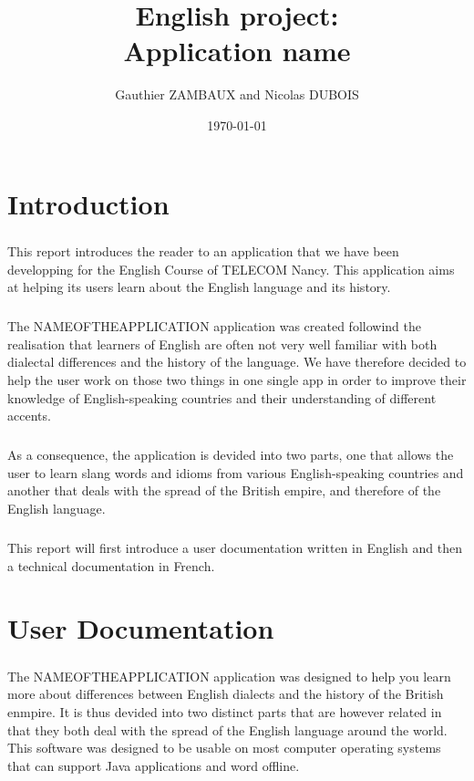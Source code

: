 \documentclass[11pt, a4paper]{report}
\title{English project:\\Application name}
\author{Gauthier ZAMBAUX and Nicolas DUBOIS}
\date{\today}
\begin{document}
\maketitle


\chapter*{Introduction}
\paragraph{}This report introduces the reader to an application that we have been developping for the English Course of TELECOM Nancy. This application aims at helping its users learn about the English language and its history.

\paragraph{}The NAMEOFTHEAPPLICATION application was created followind the realisation that learners of English are often not very well familiar with both dialectal differences and the history of the language. We have therefore decided to help the user work on those two things in one single app in order to improve their knowledge of English-speaking countries and their understanding of different accents.

\paragraph{}As a consequence, the application is devided into two parts, one that allows the user to learn slang words and idioms from various English-speaking countries and another that deals with the spread of the British empire, and therefore of the English language.

\paragraph{}This report will first introduce a user documentation written in English and then a technical documentation in French.


\chapter*{User Documentation}
\paragraph{}The NAMEOFTHEAPPLICATION application was designed to help you learn more about differences between English dialects and the history of the British enmpire. It is thus devided into two distinct parts that are however related in that they both deal with the spread of the English language around the world. This software was designed to be usable on most computer operating systems that can support Java applications and word offline.
\end{document}
